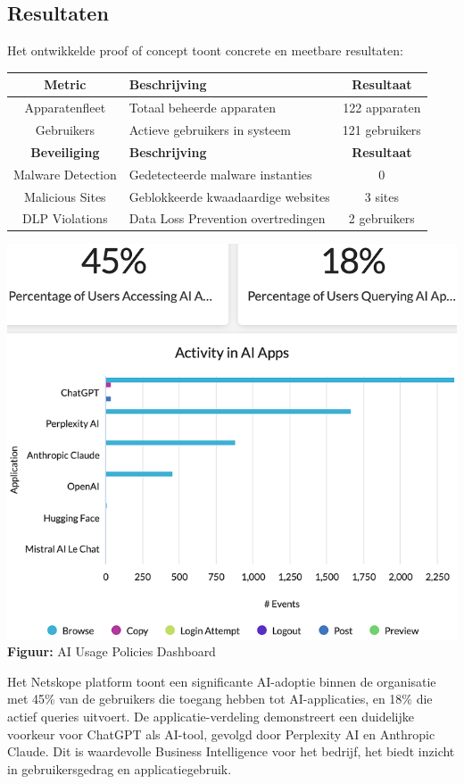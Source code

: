 \documentclass[a0,portrait]{hogent-poster}
\begin{document}
\begin{multicols}{2}
\vspace{1ex}

\section{Resultaten}
Het ontwikkelde proof of concept toont concrete en meetbare resultaten:
\begin{center}
\renewcommand{\arraystretch}{1.7}
\begin{tabular}{|c|p{20cm}|c|}
\hline
\rowcolor{gray!20}
\textbf{Metric} & \textbf{Beschrijving} & \textbf{Resultaat} \\
\hline
\rowcolor{blue!15}
Apparatenfleet & Totaal beheerde apparaten & 122 apparaten \\
\hline
\rowcolor{purple!15}
Gebruikers & Actieve gebruikers in systeem & 121 gebruikers \\
\hline
\rowcolor{gray!20}
\textbf{Beveiliging} & \textbf{Beschrijving} & \textbf{Resultaat} \\
\hline
\rowcolor{green!15}
Malware Detection & Gedetecteerde malware instanties & 0 \\
\hline
\rowcolor{red!15}
Malicious Sites & Geblokkeerde kwaadaardige websites & 3 sites \\
\hline
\rowcolor{orange!15}
DLP Violations & Data Loss Prevention overtredingen & 2 gebruikers \\
\hline
\end{tabular}
\end{center}

\begin{center}
\includegraphics[width=0.9\columnwidth]{../graphics/AI-usage.png}\\
\textbf{Figuur:} AI Usage Policies Dashboard
\end{center}
Het Netskope platform toont een significante AI-adoptie binnen de organisatie met 45\% van de gebruikers die toegang hebben tot AI-applicaties, en 18\% die actief queries uitvoert. De applicatie-verdeling demonstreert een duidelijke voorkeur voor ChatGPT als AI-tool, gevolgd door Perplexity AI en Anthropic Claude. Dit is waardevolle Business Intelligence voor het bedrijf, het biedt inzicht in gebruikersgedrag en applicatiegebruik.


\end{multicols}
\end{document}
